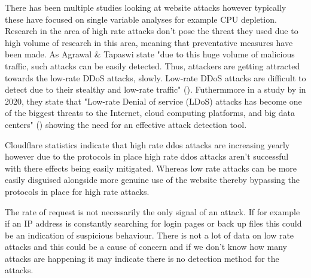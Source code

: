 
There has been multiple studies looking at website attacks however typically these have focused on single variable analyses for example CPU depletion. Research in the area of high rate attacks don't pose the threat they used due to high volume of research in this area, meaning that preventative measures have been made. As Agrawal & Tapaswi state "due to this huge volume of malicious traffic, such attacks can be easily detected. Thus, attackers are getting attracted towards the low-rate DDoS attacks, slowly. Low-rate DDoS attacks are difficult to detect due to their stealthy and low-rate traffic" (\cite{8794618}). Futhermmore in a study by \citeauthor{9016229} in 2020, they state that "Low-rate Denial of service (LDoS) attacks has become one of the biggest threats to the Internet, cloud computing platforms, and big data centers" (\cite{9016229}) showing the need for an effective attack detection tool.

Cloudflare statistics indicate that high rate ddos attacks are increasing yearly however due to the protocols in place high rate ddos attacks aren't successful with there effects being easily mitigated. Whereas low rate attacks can be more easily disguised alongside more genuine use of the website thereby bypassing the protocols in place for high rate attacks. 

The rate of request is not necessarily the only signal of an attack. If for example if an IP address is constantly searching for login pages or back up files this could be an indication of suspicious behaviour. There is not a lot of data on low rate attacks and this could be a cause of concern and if we don't know how many attacks are happening it may indicate there is no detection method for the attacks. 

